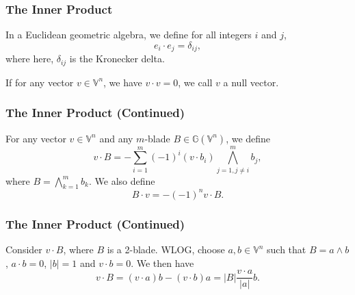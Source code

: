 \documentclass{beamer}
\newcommand{\G}{\mathbb{G}}
\newcommand{\V}{\mathbb{V}}
\begin{document}
\begin{frame}
\frametitle{The Inner Product}
\begin{definition}
In a Euclidean geometric algebra, we define for all integers $i$ and $j$,
\begin{equation*}
e_i\cdot e_j = \delta_{ij},
\end{equation*}
where here, $\delta_{ij}$ is the Kronecker delta.
\end{definition}
\begin{definition}
If for any vector $v\in\V^n$, we have $v\cdot v=0$, we call $v$ a
null vector.
\end{definition}
\end{frame}

\begin{frame}
\frametitle{The Inner Product (Continued)}
\begin{definition}
For any vector $v\in\V^n$ and any $m$-blade $B\in\G(\V^n)$, we define
\begin{equation*}
v\cdot B = -\sum_{i=1}^m (-1)^i (v\cdot b_i)\bigwedge_{j=1,j\neq i}^m b_j,
\end{equation*}
where $B = \bigwedge_{k=1}^m b_k$.  We also define
\begin{equation*}
B\cdot v = -(-1)^n v\cdot B.
\end{equation*}
\end{definition}
\end{frame}

\begin{frame}
\frametitle{The Inner Product (Continued)}
\begin{example}
Consider $v\cdot B$, where $B$ is a 2-blade.  WLOG, choose $a,b\in\V^n$ such that
$B=a\wedge b$, $a\cdot b=0$, $|b|=1$ and $v\cdot b=0$.  We then have
\begin{equation*}
v\cdot B = (v\cdot a)b - (v\cdot b)a = |B|\frac{v\cdot a}{|a|}b.
\end{equation*}
\end{example}
\end{frame}
\end{document}
